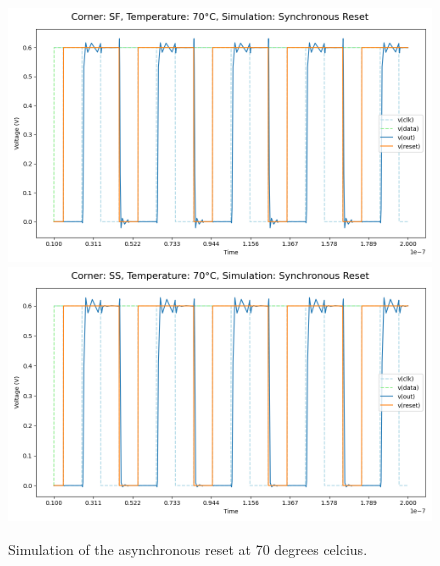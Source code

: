 \begin{figure}[H]
    \vspace{5pt}
    \includegraphics[height= 0.21\textheight]{figures/aimspice/SF70W3.png}
    \vspace{5pt}
    \includegraphics[height= 0.21\textheight]{figures/aimspice/SS70W3.png}
    \caption{Simulation of the asynchronous reset at 70 degrees celcius.}
    \label{fig:aimspice_W3_70}
\end{figure}